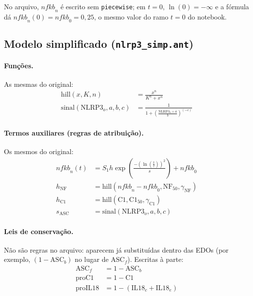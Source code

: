 \documentclass[11pt]{article}
\begin{document}
No arquivo, $\mathit{nfkb}_n$ é escrito sem \texttt{piecewise}; em $t = 0$,
$\ln(0) = -\infty$ e a fórmula dá $\mathit{nfkb}_n(0) = \mathit{nfkb}_0 = 0{,}25$, o mesmo valor
do ramo $t = 0$ do notebook.

\subsection{Modelo simplificado (\texttt{nlrp3\_simp.ant})}

\paragraph{Funções.} As mesmas do original:
\begin{align}
\mathrm{hill}(x, K, n) &= \frac{x^n}{K^n + x^n} \\
\mathrm{sinal}(\mathrm{NLRP3}_o, a, b, c) &= \frac{1}{1 + \left(\frac{\mathrm{NLRP3}_o + a}{b}\right)^{(-c)}}
\end{align}

\paragraph{Termos auxiliares (regras de atribuição).} Os mesmos do original:
\begin{align}
\mathit{nfkb}_n(t) &= S_1 h \exp\left(\frac{-(\ln(\frac{t}{\tau}))^2}{s}\right) + \mathit{nfkb}_0 \\
h_{\mathrm{NF}}  &= \mathrm{hill}(\mathit{nfkb}_n - \mathit{nfkb}_0, \mathrm{NF}_{50}, \gamma_{\mathrm{NF}}) \\
h_{\mathrm{C1}}  &= \mathrm{hill}(\mathrm{C1}, \mathrm{C1}_{50}, \gamma_{\mathrm{C1}}) \\
s_{\mathrm{ASC}} &= \mathrm{sinal}(\mathrm{NLRP3}_o, a, b, c)
\end{align}

\paragraph{Leis de conservação.} Não são regras no arquivo: aparecem já substituídas dentro
das EDOs (por exemplo, $(1 - \mathrm{ASC}_b)$ no lugar de $\mathrm{ASC}_f$). Escritas à parte:
\begin{align}
\mathrm{ASC}_f &= 1 - \mathrm{ASC}_b \\
\mathrm{proC1} &= 1 - \mathrm{C1} \\
\mathrm{proIL18} &= 1 - (\mathrm{IL18}_c + \mathrm{IL18}_e)
\end{align}
\end{document}
